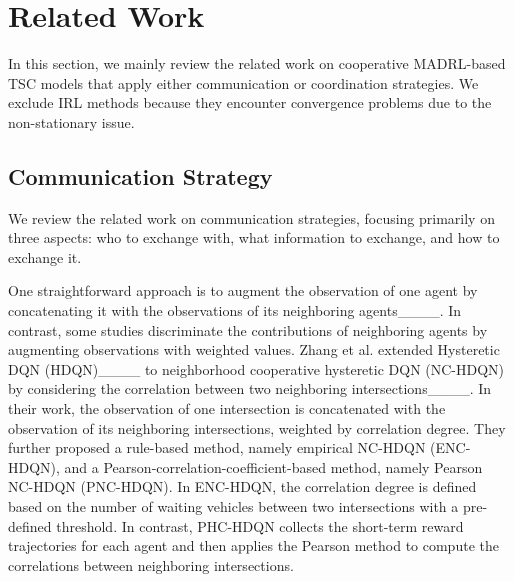 \section{Related Work}
\label{sec: related work}
In this section, we mainly review the related work on cooperative MADRL-based TSC models that apply either communication or coordination strategies. We exclude IRL methods because they encounter convergence problems due to the non-stationary issue.

\subsection{Communication Strategy}
We review the related work on communication strategies, focusing primarily on three aspects: who to exchange with, what information to exchange, and how to exchange it.

One straightforward approach is to augment the observation of one agent by concatenating it with the observations of its neighboring agents____. In contrast, some studies discriminate the contributions of neighboring agents by augmenting observations with weighted values.
Zhang et al. extended Hysteretic DQN (HDQN)____ to neighborhood cooperative hysteretic DQN (NC-HDQN) by considering the correlation between two neighboring intersections____. In their work, the observation of one intersection is concatenated with the observation of its neighboring intersections, weighted by correlation degree. They further proposed a rule-based method, namely empirical NC-HDQN (ENC-HDQN), and a Pearson-correlation-coefficient-based method, namely Pearson NC-HDQN (PNC-HDQN). In ENC-HDQN, the correlation degree is defined based on the number of waiting vehicles between two intersections with a pre-defined threshold.  In contrast, PHC-HDQN collects the short-term reward trajectories for each agent and then applies the Pearson method to compute the correlations between neighboring intersections.  

